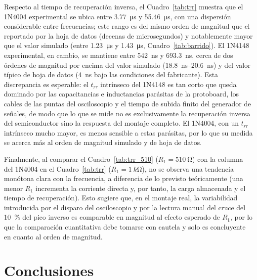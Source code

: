\documentclass[journal,a4paper]{IEEEtran}
\begin{document}
Respecto al tiempo de recuperación inversa, el Cuadro~\ref{tab:trr} muestra que el 1N4004 experimental se ubica entre \SI{3.77}{\micro s} y \SI{55.46}{\micro s}, con una dispersión considerable entre frecuencias; este rango es del mismo orden de magnitud que el reportado por la hoja de datos (decenas de microsegundos) y notablemente mayor que el valor simulado (entre \SI{1.23}{\micro s} y \SI{1.43}{\micro s}, Cuadro~\ref{tab:barrido}). El 1N4148 experimental, en cambio, se mantiene entre \SI{542}{ns} y \SI{693.3}{ns}, cerca de dos órdenes de magnitud por encima del valor simulado (\SIrange{18.8}{20.6}{ns}) y del valor típico de hoja de datos (\SI{4}{ns} bajo las condiciones del fabricante). Esta discrepancia es esperable: el $t_{rr}$ intrínseco del 1N4148 es tan corto que queda dominado por las capacitancias e inductancias parásitas de la protoboard, los cables de las puntas del osciloscopio y el tiempo de subida finito del generador de señales, de modo que lo que se mide no es exclusivamente la recuperación inversa del semiconductor sino la respuesta del montaje completo. El 1N4004, con un $t_{rr}$ intrínseco mucho mayor, es menos sensible a estas parásitas, por lo que su medida se acerca más al orden de magnitud simulado y de hoja de datos.

Finalmente, al comparar el Cuadro~\ref{tab:trr_510} ($R_1=\SI{510}{\ohm}$) con la columna del 1N4004 en el Cuadro~\ref{tab:trr} ($R_1=\SI{1}{k\ohm}$), no se observa una tendencia monótona clara con la frecuencia, a diferencia de lo previsto teóricamente (una menor $R_1$ incrementa la corriente directa y, por tanto, la carga almacenada y el tiempo de recuperación). Esto sugiere que, en el montaje real, la variabilidad introducida por el disparo del osciloscopio y por la lectura manual del cruce del \SI{10}{\percent} del pico inverso es comparable en magnitud al efecto esperado de $R_1$, por lo que la comparación cuantitativa debe tomarse con cautela y solo es concluyente en cuanto al orden de magnitud.

\section{Conclusiones}
\end{document}
